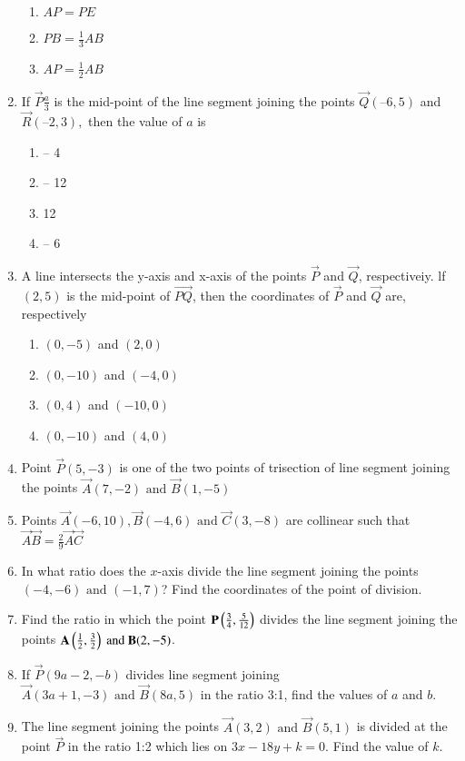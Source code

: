 \begin{enumerate}[label=\thesubsection.\arabic*,ref=\thesubsection.\theenumi]
\begin{enumerate}
\item ${AP}={PE}$
\item ${PB}=\frac{1}{3}{AB}$
\item${AP}=\frac{1}{2}{AB}$
 \end{enumerate}
 \item If  $\vec{P}\frac{a}{3}$ is the mid-point of the line segment joining the points $\vec{Q} (– 6, 5)$  and $\vec{R}(– 2, 3),$ then the value of $a$ is
\begin{enumerate}
\item – 4
\item – 12
\item 12
\item – 6
\end{enumerate}
\item A line intersects the y-axis and x-axis of the points $\vec{P}$  and $\vec{Q}$, respectiveiy. lf $(2,5)$ is the mid-point of $\vec{PQ}$, then the coordinates of $\vec{P}$ and $ \vec{Q}$ are, respectively
\begin{enumerate}
	\item$(0,-5)$ and $(2,0)$
	\item$(0,-10)$ and $(-4,0)$
	\item$(0,4)$ and  $(-10,0)$
	\item$(0,-10)$ and $(4,0)$
\end{enumerate}
\item Point $\vec{P}(5,-3)$ is one of the two points of trisection of line segment joining the points $\vec{A}(7,-2)\text{ and }\vec{B}(1,-5)$
\item Points $\vec{A}(-6,10),\vec{B}(-4,6) \text{ and } \vec{C}(3,-8)$ are collinear such that $\vec{A}\vec{B}=  \frac{2}{9}\vec{A}\vec{C}$
\item In what ratio does the $x$-axis divide the line segment joining the points $(-4,-6)\text{ and }(-1,7)$? Find the coordinates of the point of division.
\item Find the ratio in which the point $\mathbf{P}\left(\frac{3}{4},\frac{5}{12}\right)$ divides the line segment joining the points $\mathbf{A}\left(\frac{1}{2},\frac{3}{2}\right)\text{ and } \mathbf{B}(2,-5)$.
\item If $\vec{P}(9a-2,-b)$ divides line segment joining $\vec{A}(3a+1,-3)\text{ and }\vec{B}(8a,5)$ in the ratio 3:1, find the values of $a$ and $b$.
\item The line segment joining the points $\vec{A}(3,2)\text{ and }\vec{B}(5,1)$ is divided at the point $\vec{P}$ in the ratio 1:2 which lies on $3x-18y+k=0$. Find the value of $k$.  

\end{enumerate}
